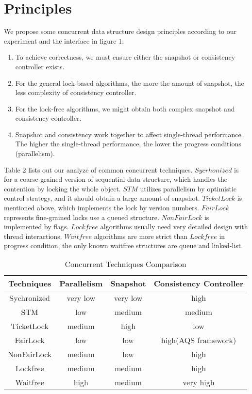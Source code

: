 \documentclass{article}
\begin{document}
\section{Principles}
We propose some concurrent data structure design principles according to our experiment and the interface in figure 1:
    \begin{enumerate}
    \item To achieve correctness, we must ensure either the snapshot or consistency controller exists.
    \item For the general lock-based algorithms, the more the amount of snapshot, the less complexity of consistency controller.
    \item For the lock-free algorithms, we might obtain both complex snapshot and consistency controller.
    \item Snapshot and consistency work together to affect single-thread performance. The higher the single-thread performance, the lower the progress conditions (parallelism).
    \end{enumerate}
Table 2 lists out our analyze of common concurrent techniques. $
Sycrhonized$ is for a coarse-grained version of sequential data structure, which handles the contention by locking the whole object. $STM$ utilizes parallelism by optimistic control strategy, and it should obtain a large amount of snapshot. $TicketLock$ is mentioned above, which implements the lock by version numbers. $FairLock$ represents fine-grained locks use a queued structure. $NonFairLock$ is implemented by flags. $Lockfree$ algorithms usually need very detailed design with thread interactions. $Waitfree$ algorithms are more strict than $Lockfree$ in progress condition, the only known waitfree structures are queue\cite{kogan2011wait} and linked-list\cite{timnat2012wait}.
        \begin{table}[htbp]
    \centering
    \begin{tabular}{c|c|c|c}
     \hline
     \textbf{Techniques} & \textbf{Parallelism} & \textbf{Snapshot} & \textbf{Consistency Controller}  \\
     \hline
     Sychronized & very low & very low & high \\
     STM & low & medium & medium\\
     TicketLock & medium & high & low\\
     FairLock & low & low & high(AQS framework)\\
     NonFairLock & medium & low & high\\
     Lockfree & medium & medium & high\\
     Waitfree & high & medium & very high\\
     \hline
    \end{tabular}
    \caption{Concurrent Techniques Comparison}
    \label{tab:my_label}
    \end{table}
\end{document}
